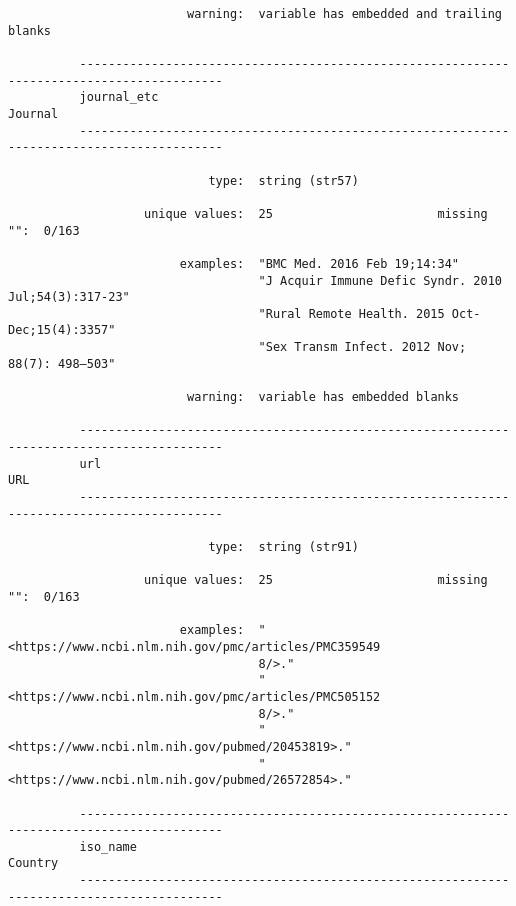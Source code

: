 \documentclass{article}
\begin{document}
\begin{verbatim}
                         warning:  variable has embedded and trailing blanks
          
          ------------------------------------------------------------------------------------------
          journal_etc                                                                        Journal
          ------------------------------------------------------------------------------------------
          
                            type:  string (str57)
          
                   unique values:  25                       missing "":  0/163
          
                        examples:  "BMC Med. 2016 Feb 19;14:34"
                                   "J Acquir Immune Defic Syndr. 2010 Jul;54(3):317-23"
                                   "Rural Remote Health. 2015 Oct-Dec;15(4):3357"
                                   "Sex Transm Infect. 2012 Nov; 88(7): 498–503"
          
                         warning:  variable has embedded blanks
          
          ------------------------------------------------------------------------------------------
          url                                                                                    URL
          ------------------------------------------------------------------------------------------
          
                            type:  string (str91)
          
                   unique values:  25                       missing "":  0/163
          
                        examples:  "<https://www.ncbi.nlm.nih.gov/pmc/articles/PMC359549
                                   8/>."
                                   "<https://www.ncbi.nlm.nih.gov/pmc/articles/PMC505152
                                   8/>."
                                   "<https://www.ncbi.nlm.nih.gov/pubmed/20453819>."
                                   "<https://www.ncbi.nlm.nih.gov/pubmed/26572854>."
          
          ------------------------------------------------------------------------------------------
          iso_name                                                                           Country
          ------------------------------------------------------------------------------------------
          

\end{verbatim}
\end{document}
